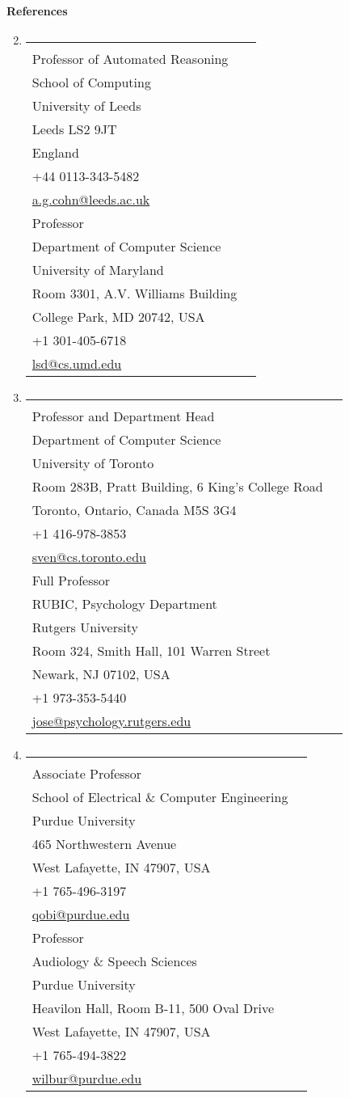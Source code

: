 \documentclass[10pt]{article}
\makeatletter
\newenvironment{benumerate}[2]{
    \let\oldItem\item
    \def\item{\addtocounter{enumi}{-2}\oldItem}
    \begin{enumerate}[#2]
    \setcounter{enumi}{#1}
    \addtocounter{enumi}{1}}
  {\end{enumerate}}
\newcommand{\reference}[8]{%
  \begin{tabular}{@{}l@{}}%
    \textbf{#1}\\%
    #2\\%
    #3\\%
    #4\\%
    #5\\%
    #6\\%
    #7\\%
    \href{mailto:#8}{#8}%
  \end{tabular}%
}
\newcommand{\refrow}[2]{%
\item \begin{tabular*}{0.9\textwidth}{@{}p{3.0in}@{\hspace*{0.3in}}p{3.0in}@{}} #1 & #2 \end{tabular*}
\vspace*{1ex}}
\newenvironment{region}[3]{%
  \vspace*{0.5ex}
  {\large \textbf{#1}}
  \begin{benumerate}{#3}{\color{RoyalBlue}#2}}
  {\end{benumerate}\vspace*{1ex}}
\newenvironment{nonumregion}[1]{%
\begin{region}{#1}{}{1}}
{\end{region}\vspace*{1ex}}
\makeatother
\begin{document}
\begin{nonumregion}{References}
  \refrow{
    \reference{Tony Cohn}
    {Professor of Automated Reasoning}
    {School of Computing}
    {University of Leeds}
    {Leeds LS2 9JT}
    {England}
    {+44 0113-343-5482}
    {a.g.cohn@leeds.ac.uk}
  }{
    \reference{Larry Davis}
    {Professor}
    {Department of Computer Science}
    {University of Maryland}
    {Room 3301, A.V. Williams Building}
    {College Park, MD 20742, USA}
    {+1 301-405-6718}
    {lsd@cs.umd.edu}
  }
  \refrow{
    \reference{Sven Dickinson}
    {Professor and Department Head}
    {Department of Computer Science}
    {University of Toronto}
    {Room 283B, Pratt Building, 6 King's College Road}
    {Toronto, Ontario, Canada M5S 3G4}
    {+1 416-978-3853}
    {sven@cs.toronto.edu}
  }{
    \reference{Stephen Jos\'e Hanson}
    {Full Professor}
    {RUBIC, Psychology Department}
    {Rutgers University}
    {Room 324, Smith Hall, 101 Warren Street}
    {Newark, NJ 07102, USA}
    {+1 973-353-5440}
    {jose@psychology.rutgers.edu}
  }
  \refrow{
    \reference{Jeffrey Mark Siskind}
    {Associate Professor}
    {School of Electrical \& Computer Engineering}
    {Purdue University}
    {465 Northwestern Avenue}
    {West Lafayette, IN 47907, USA}
    {+1 765-496-3197}
    {qobi@purdue.edu}
  }{
    \reference{Ronnie Wilbur}
    {Professor}
    {Audiology \& Speech Sciences}
    {Purdue University}
    {Heavilon Hall, Room B-11, 500 Oval Drive}
    {West Lafayette, IN 47907, USA}
    {+1 765-494-3822}
    {wilbur@purdue.edu}
  }
\end{nonumregion}
\end{document}
